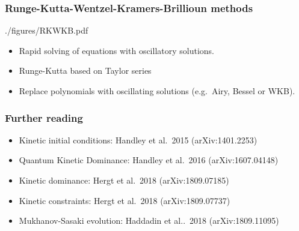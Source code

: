 \documentclass[%
]{beamer}
\begin{document}
\begin{frame}
    \frametitle{Runge-Kutta-Wentzel-Kramers-Brillioun methods}
    \begin{figright}[0.3]{./figures/RKWKB.pdf}
        \begin{itemize}
            \item Rapid solving of equations with oscillatory solutions.
            \item Runge-Kutta based on Taylor series
            \item Replace polynomials with oscillating solutions (e.g.\ Airy, Bessel or WKB).
        \end{itemize}
    \end{figright}
\end{frame}

\begin{frame}
    \frametitle{Further reading}
    \begin{itemize}
        \item Kinetic initial conditions: Handley et al.\ 2015 (arXiv:1401.2253)
        \item Quantum Kinetic Dominance: Handley et al.\ 2016 (arXiv:1607.04148)
        \item Kinetic dominance: Hergt et al.\ 2018 (arXiv:1809.07185)
        \item Kinetic constraints: Hergt et al.\ 2018 (arXiv:1809.07737)
        \item Mukhanov-Sasaki evolution: Haddadin et al..\ 2018 (arXiv:1809.11095)
    \end{itemize}
\end{frame}
\end{document}
